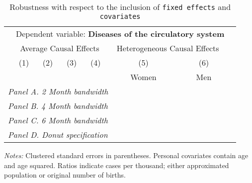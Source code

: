  \begin{table}[H] \begin{threeparttable} \centering \caption{Robustness with respect to the inclusion of \texttt{fixed effects} and \texttt{covariates}} {\def\sym#1{\ifmmode^{#1}\else\(^{#1}\)\fi} \begin{tabular}{l*{7}{c}} \toprule & \multicolumn{6}{c}{Dependent variable: \textbf{Diseases of the circulatory system}} \\ \cmidrule(lr){2-7}
            &\multicolumn{4}{c}{Average Causal Effects}         &\multicolumn{2}{c}{Heterogeneous Causal Effects}\\\cmidrule(lr){2-5}\cmidrule(lr){6-7}
            &\multicolumn{1}{c}{(1)}&\multicolumn{1}{c}{(2)}&\multicolumn{1}{c}{(3)}&\multicolumn{1}{c}{(4)}&\multicolumn{1}{c}{(5)}&\multicolumn{1}{c}{(6)}\\
            &\multicolumn{1}{c}{}&\multicolumn{1}{c}{}&\multicolumn{1}{c}{}&\multicolumn{1}{c}{}&\multicolumn{1}{c}{Women}&\multicolumn{1}{c}{Men}\\
\midrule
 \multicolumn{7}{l}{\emph{Panel A. 2 Month bandwidth}} \\    \midrule\multicolumn{7}{l}{\emph{Panel B. 4 Month bandwidth}} \\    \midrule\multicolumn{7}{l}{\emph{Panel C. 6 Month bandwidth}} \\    \midrule\multicolumn{7}{l}{\emph{Panel D. Donut specification}} \\    \midrule  
\bottomrule \end{tabular} } \begin{tablenotes} \item \scriptsize \emph{Notes:} Clustered standard errors in parentheses. Personal covariates contain age and age squared. Ratios indicate cases per thousand; either approximated population or original number of births. \end{tablenotes} \end{threeparttable} \end{table} 
